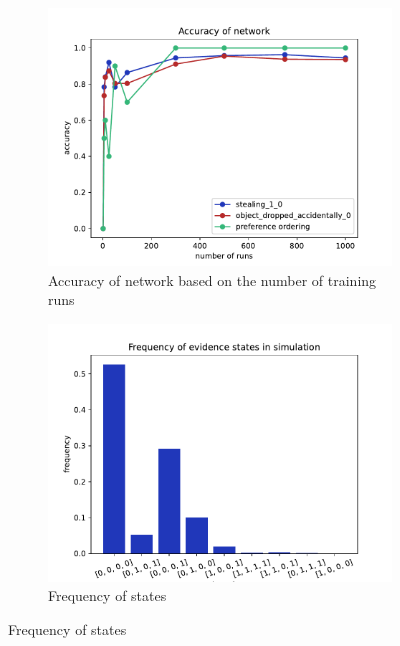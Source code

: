 \documentclass[12pt]{article}
\begin{document}
\begin{figure}[htbp]
\begin{center}
\begin{subfigure}{0.6\textwidth}
\includegraphics[width=\linewidth]{GroteMarktPrivateEND/plots/accuracy.pdf}
\caption{Accuracy of network based on the number of training runs}
\label{girl}
\end{subfigure}%
\begin{subfigure}{0.6\textwidth}
\includegraphics[width=\linewidth]{GroteMarktPrivateEND/plots/freqStates.pdf}
\caption{Frequency of states}
\label{fifteen}
\end{subfigure}
\end{center}
\end{figure}
\end{document}

